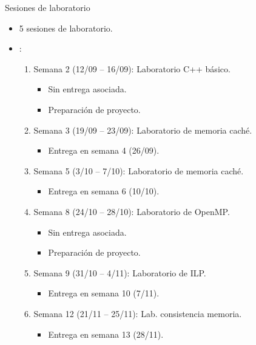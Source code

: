 \begin{frame}[t]{Sesiones de laboratorio}
\begin{itemize}
  \item 5 sesiones de laboratorio.

  \vfill
  \item {}:
    \begin{enumerate}
      \item Semana 2 (12/09 -- 16/09): Laboratorio C++ básico.
        \begin{itemize}
          \item Sin entrega asociada.
          \item Preparación de proyecto.
        \end{itemize}
      \item Semana 3 (19/09 -- 23/09): Laboratorio de memoria caché.
        \begin{itemize}
          \item Entrega en semana 4 (26/09).
        \end{itemize}
      \item Semana 5 (3/10 -- 7/10): Laboratorio de memoria caché.
        \begin{itemize}
          \item Entrega en semana 6 (10/10).
        \end{itemize}
      \item Semana 8 (24/10 -- 28/10): Laboratorio de OpenMP.
        \begin{itemize}
          \item Sin entrega asociada.
          \item Preparación de proyecto.
        \end{itemize}
      \item Semana 9 (31/10 -- 4/11): Laboratorio de ILP.
        \begin{itemize}
          \item Entrega en semana 10 (7/11).
        \end{itemize}
      \item Semana 12 (21/11 -- 25/11): Lab. consistencia memoria.
        \begin{itemize}
          \item Entrega en semana 13 (28/11).
        \end{itemize}
    \end{enumerate}
\end{itemize}
\end{frame}

